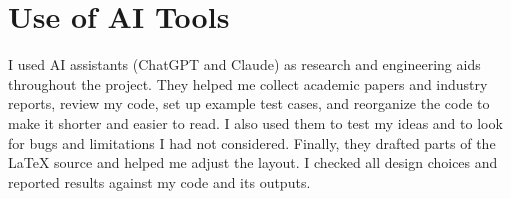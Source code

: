 \section*{Use of AI Tools}
\label{sec:ai}

I used AI assistants (ChatGPT and Claude) as research and engineering aids throughout the project. They helped me collect academic papers and industry reports, review my code, set up example test cases, and reorganize the code to make it shorter and easier to read. I also used them to test my ideas and to look for bugs and limitations I had not considered. Finally, they drafted parts of the \LaTeX{} source and helped me adjust the layout. I checked all design choices and reported results against my code and its outputs.

